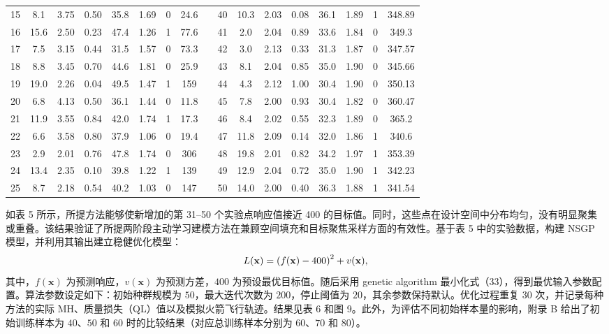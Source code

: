 \documentclass[]{interact}
\theoremstyle{plain}%
\theoremstyle{definition}
\theoremstyle{remark}
\begin{document}
\begin{table}[h!]
{\begin{tabular}{c cccccc c c cccccc cc}
			15 &  8.1 & 3.75 & 0.50 & 35.8 & 1.69 & 0 & 24.6   & & 40 & 10.3 & 2.03 & 0.08 & 36.1 & 1.89 & 1 & 348.89 \\
			16 & 15.6 & 2.50 & 0.23 & 47.4 & 1.26 & 1 & 77.6   & & 41 &  2.0 & 2.04 & 0.89 & 33.6 & 1.84 & 0 & 349.3  \\
			17 &  7.5 & 3.15 & 0.44 & 31.5 & 1.57 & 0 & 73.3   & & 42 &  3.0 & 2.13 & 0.33 & 31.3 & 1.87 & 0 & 347.57 \\
			18 &  8.8 & 3.45 & 0.70 & 44.6 & 1.81 & 0 & 25.9   & & 43 &  8.1 & 2.04 & 0.85 & 35.0 & 1.90 & 0 & 345.66 \\
			19 & 19.0 & 2.26 & 0.04 & 49.5 & 1.47 & 1 & 159    & & 44 &  4.3 & 2.12 & 1.00 & 30.4 & 1.90 & 0 & 350.13 \\
			20 &  6.8 & 4.13 & 0.50 & 36.1 & 1.44 & 0 & 11.8   & & 45 &  7.8 & 2.00 & 0.93 & 30.4 & 1.82 & 0 & 360.47 \\
			21 & 11.9 & 3.55 & 0.84 & 42.0 & 1.74 & 1 & 17.3   & & 46 &  8.4 & 2.02 & 0.55 & 32.3 & 1.89 & 0 & 365.2  \\
			22 &  6.6 & 3.58 & 0.80 & 37.9 & 1.06 & 0 & 19.4   & & 47 & 11.8 & 2.09 & 0.14 & 32.0 & 1.86 & 1 & 340.6  \\
			23 &  2.9 & 2.01 & 0.76 & 47.8 & 1.74 & 0 & 306    & & 48 & 19.8 & 2.01 & 0.82 & 34.2 & 1.97 & 1 & 353.39 \\
			24 & 13.4 & 2.35 & 0.10 & 39.8 & 1.22 & 1 & 139    & & 49 & 12.9 & 2.04 & 0.72 & 35.0 & 1.90 & 1 & 342.23 \\
			25 &  8.7 & 2.18 & 0.54 & 40.2 & 1.03 & 0 & 147    & & 50 & 14.0 & 2.00 & 0.40 & 36.3 & 1.88 & 1 & 341.54 \\
			\bottomrule
			\end{tabular}}
	\end{table}
	
	如表 5 所示，所提方法能够使新增加的第 31--50 个实验点响应值接近 400 的目标值。同时，这些点在设计空间中分布均匀，没有明显聚集或重叠。该结果验证了所提两阶段主动学习建模方法在兼顾空间填充和目标聚焦采样方面的有效性。基于表 5 中的实验数据，构建 NSGP 模型，并利用其输出建立稳健优化模型：
	\begin{equation}
		L({\bf{x}}) = {\left( {f({\bf{x}}) - 400} \right)^2} + v({\bf{x}}),
	\end{equation}
	其中，$f(\mathbf{x})$ 为预测响应，$v(\mathbf{x})$ 为预测方差，$400$ 为预设最优目标值。随后采用 genetic algorithm 最小化式（33），得到最优输入参数配置。算法参数设定如下：初始种群规模为 $50$，最大迭代次数为 $200$，停止阈值为 $20$，其余参数保持默认。优化过程重复 $30$ 次，并记录每种方法的实际 MH、质量损失（QL）值以及模拟火箭飞行轨迹。结果见表 6 和图 9。此外，为评估不同初始样本量的影响，附录 B 给出了初始训练样本为 $40$、$50$ 和 $60$ 时的比较结果（对应总训练样本分别为 $60$、$70$ 和 $80$）。
\end{document}

